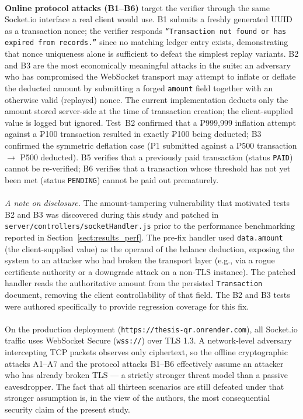 \paragraph{}\textbf{Online protocol attacks (B1--B6)} target the verifier through the same Socket.io interface a real client would use. B1 submits a freshly generated UUID as a transaction nonce; the verifier responds \texttt{``Transaction not found or has expired from records.''} since no matching ledger entry exists, demonstrating that nonce uniqueness alone is sufficient to defeat the simplest replay variants. B2 and B3 are the most economically meaningful attacks in the suite: an adversary who has compromised the WebSocket transport may attempt to inflate or deflate the deducted amount by submitting a forged \texttt{amount} field together with an otherwise valid (replayed) nonce. The current implementation deducts only the amount stored server-side at the time of transaction creation; the client-supplied value is logged but ignored. Test~B2 confirmed that a ₱999{,}999 inflation attempt against a ₱100 transaction resulted in exactly ₱100 being deducted; B3 confirmed the symmetric deflation case (₱1 submitted against a ₱500 transaction $\to$ ₱500 deducted). B5 verifies that a previously paid transaction (status \texttt{PAID}) cannot be re-verified; B6 verifies that a transaction whose threshold has not yet been met (status \texttt{PENDING}) cannot be paid out prematurely.

\paragraph{}\textit{A note on disclosure.} The amount-tampering vulnerability that motivated tests B2 and B3 was discovered during this study and patched in \texttt{server/controllers/socketHandler.js} prior to the performance benchmarking reported in Section~\ref{sect:results_perf}. The pre-fix handler used \texttt{data.amount} (the client-supplied value) as the operand of the balance deduction, exposing the system to an attacker who had broken the transport layer (e.g., via a rogue certificate authority or a downgrade attack on a non-TLS instance). The patched handler reads the authoritative amount from the persisted \texttt{Transaction} document, removing the client controllability of that field. The B2 and B3 tests were authored specifically to provide regression coverage for this fix.

\paragraph{}On the production deployment (\texttt{https://thesis-qr.onrender.com}), all Socket.io traffic uses WebSocket Secure (\texttt{wss://}) over TLS 1.3. A network-level adversary intercepting TCP packets observes only ciphertext, so the offline cryptographic attacks A1--A7 and the protocol attacks B1--B6 effectively assume an attacker who has already broken TLS --- a strictly stronger threat model than a passive eavesdropper. The fact that all thirteen scenarios are still defeated under that stronger assumption is, in the view of the authors, the most consequential security claim of the present study.

